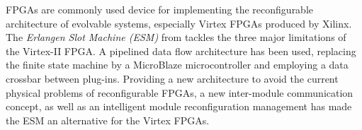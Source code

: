 \label{sec:erlangen}
FPGAs are commonly used device for implementing the reconfigurable architecture of evolvable systems, especially Virtex FPGAs produced by Xilinx. The \emph{Erlangen Slot Machine (ESM)} from \cite{erlangen} tackles the three major limitations of the Virtex-II FPGA. A pipelined data flow architecture has been used, replacing the finite state machine by a MicroBlaze microcontroller and employing a data crossbar between plug-ins. Providing a new architecture to avoid the current physical problems of reconfigurable FPGAs, a new inter-module communication concept, as well as an intelligent module reconfiguration management has made the ESM an alternative for the Virtex FPGAs.
